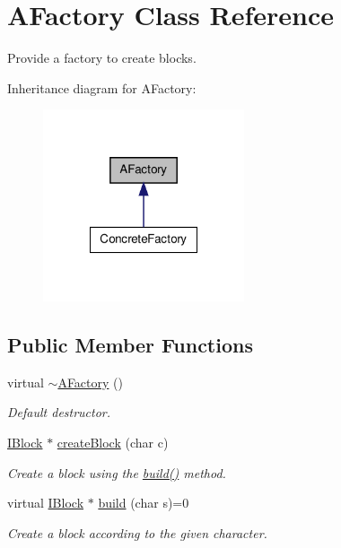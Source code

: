 \hypertarget{class_a_factory}{\section{A\-Factory Class Reference}
\label{class_a_factory}
}


Provide a factory to create blocks.  




Inheritance diagram for A\-Factory\-:\nopagebreak
\begin{figure}[H]
\begin{center}
\leavevmode
\includegraphics[width=168pt]{class_a_factory__inherit__graph}
\end{center}
\end{figure}
\subsection*{Public Member Functions}
\begin{DoxyCompactItemize}
\item 
\hypertarget{class_a_factory_a5c61aa93311f5ffe67ef07f24375e548}{virtual \hyperlink{class_a_factory_a5c61aa93311f5ffe67ef07f24375e548}{$\sim$\-A\-Factory} ()}\label{class_a_factory_a5c61aa93311f5ffe67ef07f24375e548}

\begin{DoxyCompactList}\small\item\em Default destructor. \end{DoxyCompactList}\item 
\hyperlink{class_i_block}{I\-Block} $\ast$ \hyperlink{class_a_factory_ac0e9f907f902b54796047020683b81e9}{create\-Block} (char c)
\begin{DoxyCompactList}\small\item\em Create a block using the \hyperlink{class_a_factory_adec2bf9f81dbf37ef727bcfb43403867}{build()} method. \end{DoxyCompactList}\item 
virtual \hyperlink{class_i_block}{I\-Block} $\ast$ \hyperlink{class_a_factory_adec2bf9f81dbf37ef727bcfb43403867}{build} (char s)=0
\begin{DoxyCompactList}\small\item\em Create a block according to the given character. \end{DoxyCompactList}\end{DoxyCompactItemize}
